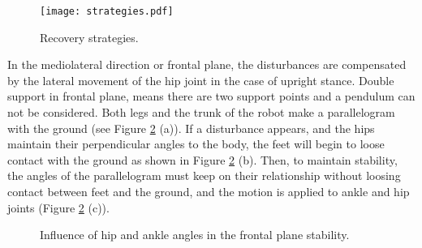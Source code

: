 \begin{figure}[!htbp]
\centering
\texttt{[image: strategies.pdf]}
\caption{Recovery strategies.} \label{fig:strategies}
\end{figure}

In the mediolateral direction or frontal plane, the disturbances are compensated by the lateral movement of the hip joint in the case of upright stance. Double support in frontal plane, means there are two support points and a pendulum can not be considered. Both legs and the trunk of the robot make a parallelogram with the ground (see Figure \ref{fig:piernas} (a)). If a disturbance appears, and the hips maintain their perpendicular angles to the body, the feet will begin to loose contact with the ground as shown in Figure \ref{fig:piernas} (b). Then, to maintain stability, the angles of the parallelogram must keep on their relationship without loosing contact between feet and the ground, and the motion is applied to ankle and hip joints (Figure \ref{fig:piernas} (c)). 


\begin{figure}[!htbp]
\centering
{}
\caption{Influence of hip and ankle angles in the frontal plane stability.} \label{fig:piernas}
\end{figure}

